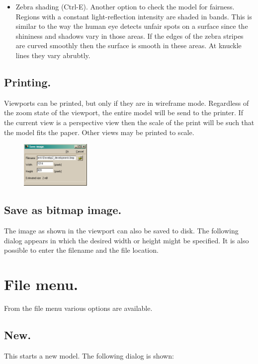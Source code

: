 \documentclass[12pt]{article}
\begin{document}
\begin{itemize}
  \item Zebra shading (Ctrl-E). Another option to check the model for
fairness. Regions with a constant light-reflection intensity are
shaded in bands. This is similar to the way the human eye detects
unfair spots on a surface since the shininess and shadows vary in
those areas. If the edges of the zebra stripes are curved smoothly
then the surface is smooth in these areas. At knuckle lines they vary
abrubtly.

\end{itemize}

\subsection{Printing.}
Viewports can be printed, but only if they are in wireframe
mode. Regardless of the zoom state of the viewport, the entire model
will be send to the printer. If the current view is a perspective view
then the scale of the print will be such that the model fits the
paper. Other views may be printed to scale.

\begin{figure}
        \centering
        \includegraphics[width=0.3\textwidth,natwidth=570,natheight=377]{saveimagedialog.png}
        \caption{}
        \label{fig:saveas}
\end{figure}

\subsection{Save as bitmap image.}
The image as shown in the viewport can also be saved to disk. The
following dialog appears in which the desired width or height might be
specified. It is also possible to enter the filename and the file
location.

\section{File menu.}
From the file menu various options are available.

\subsection{New.}
This starts a new model. The following dialog is shown:
\end{document}
